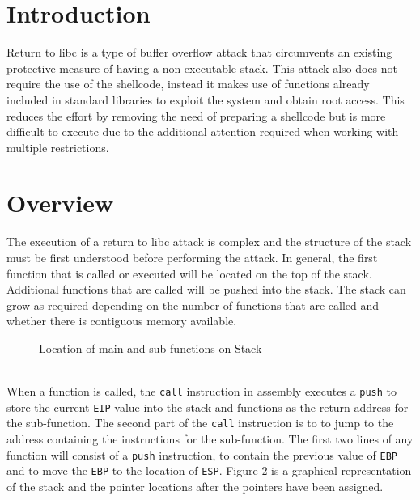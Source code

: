 \documentclass[a4paper,12pt]{article}
\makeatletter
\DeclareRobustCommand{\rvdots}{%
	\vbox{
		\baselineskip4\p@\lineskiplimit\z@
		\kern-\p@
		\hbox{.}\hbox{.}\hbox{.}
}}
\makeatother
\begin{document}
\newpage
{}
\setcounter{section}{0}
\section{Introduction}
Return to libc is a type of buffer overflow attack that circumvents an existing protective measure of having a non-executable stack. This attack also does not require the use of the shellcode, instead it makes use of functions already included in standard libraries to exploit the system and obtain root access. This reduces the effort by removing the need of preparing a shellcode but is more difficult to execute due to the additional attention required when working with multiple restrictions.
\section{Overview}
The execution of a return to libc attack is complex and the structure of the stack must be first understood before performing the attack. In general, the first function that is called or executed will be located on the top of the stack. Additional functions that are called will be pushed into the stack. The stack can grow as required depending on the number of functions that are called and whether there is contiguous memory available.
\begin{figure}[!h]
	\centering
	\caption{Location of main and sub-functions on Stack}
\end{figure}
\\When a function is called, the \texttt{call} instruction in assembly executes a \texttt{push} to store the current \texttt{EIP} value into the stack and functions as the return address for the sub-function. The second part of the \texttt{call} instruction is to to jump to the address containing the instructions for the sub-function. The first two lines of any function will consist of a \texttt{push} instruction, to contain the previous value of \texttt{EBP} and to move the \texttt{EBP} to the location of \texttt{ESP}. Figure 2 is a graphical representation of the stack and the pointer locations after the pointers have been assigned.
\end{document}
